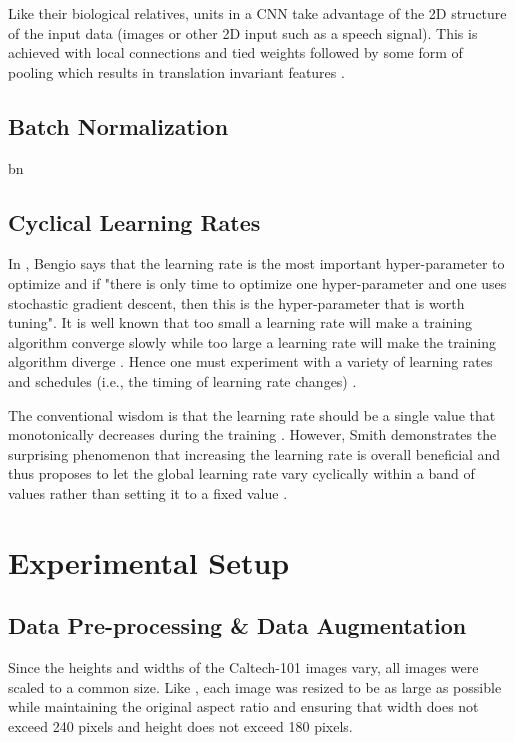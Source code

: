 \documentclass[a4paper, 11pt]{article}
\begin{document}
Like their biological relatives, units in a CNN take advantage of the 2D structure of the input data (images or other 2D input such as a speech signal).
This is achieved with local connections and tied weights followed by some form of pooling which results in translation invariant features \cite{StanfordTutCNN2015}.

\subsection{Batch Normalization}
bn \cite{Ioffe2015}



\subsection{Cyclical Learning Rates}
In \cite{Bengio2012}, Bengio says that the learning rate is the most important hyper-parameter to optimize and if "there is only time to optimize one hyper-parameter and one uses stochastic gradient descent, then this is the hyper-parameter that is worth tuning".
It is well known that too small a learning rate will make a training algorithm converge slowly while too large a learning rate will make the training algorithm diverge \cite{Zeiler2012}.
Hence one must experiment with a variety of learning rates and schedules (i.e., the timing of learning rate changes) \cite{Smith2015}.

The conventional wisdom is that the learning rate should be a single value that monotonically decreases during the training \cite{Smith2015}.
However, Smith demonstrates the surprising phenomenon that increasing the learning rate is overall beneficial and thus proposes to let the global learning rate vary cyclically within a band of values rather than setting it to a fixed value \cite{Smith2015}.



\section{Experimental Setup}

\subsection{Data Pre-processing \& Data Augmentation}
Since the heights and widths of the Caltech-101 images vary, all images were scaled to a common size. 
Like \cite{Orchard2015}, each image was resized to be as large as possible while maintaining the original aspect ratio and ensuring that width does not exceed 240 pixels and height does not exceed 180 pixels.
\end{document}
